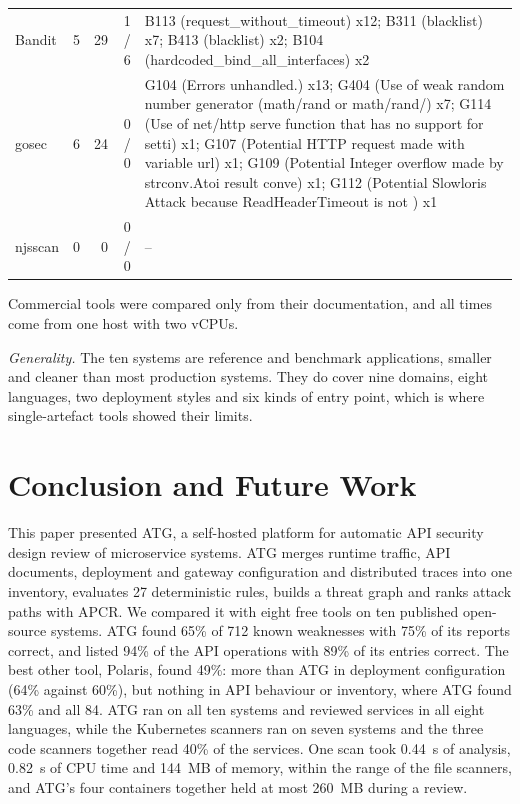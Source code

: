 \documentclass[conference]{IEEEtran}
\begin{document}
\begin{table}[!t]
\begin{tabular}{@{}lrrr>{\raggedright\arraybackslash}p{12.2cm}@{}}
Bandit & 5 & 29 & 1 / 6 & B113 (request\_without\_timeout) x12; B311 (blacklist) x7; B413 (blacklist) x2; B104 (hardcoded\_bind\_all\_interfaces) x2 \\
gosec & 6 & 24 & 0 / 0 & G104 (Errors unhandled.) x13; G404 (Use of weak random number generator (math/rand or math/rand/) x7; G114 (Use of net/http serve function that has no support for setti) x1; G107 (Potential HTTP request made with variable url) x1; G109 (Potential Integer overflow made by strconv.Atoi result conve) x1; G112 (Potential Slowloris Attack because ReadHeaderTimeout is not ) x1 \\
njsscan & 0 & 0 & 0 / 0 & – \\
\bottomrule
\end{tabular}
\end{table}

Commercial tools were compared only from their documentation, and all times come from one host with two vCPUs.

\textit{Generality.} The ten systems are reference and benchmark applications, smaller and cleaner than most production systems. They do cover nine domains, eight languages, two deployment styles and six kinds of entry point, which is where single-artefact tools showed their limits.

\section{Conclusion and Future Work}\label{sec:conclusion}
This paper presented ATG, a self-hosted platform for automatic API security design review of microservice systems. ATG merges runtime traffic, API documents, deployment and gateway configuration and distributed traces into one inventory, evaluates 27 deterministic rules, builds a threat graph and ranks attack paths with APCR. We compared it with eight free tools on ten published open-source systems. ATG found 65\% of 712 known weaknesses with 75\% of its reports correct, and listed 94\% of the API operations with 89\% of its entries correct. The best other tool, Polaris, found 49\%: more than ATG in deployment configuration (64\% against 60\%), but nothing in API behaviour or inventory, where ATG found 63\% and all 84. ATG ran on all ten systems and reviewed services in all eight languages, while the Kubernetes scanners ran on seven systems and the three code scanners together read 40\% of the services. One scan took 0.44~s of analysis, 0.82~s of CPU time and 144~MB of memory, within the range of the file scanners, and ATG's four containers together held at most 260~MB during a review.
\end{document}
